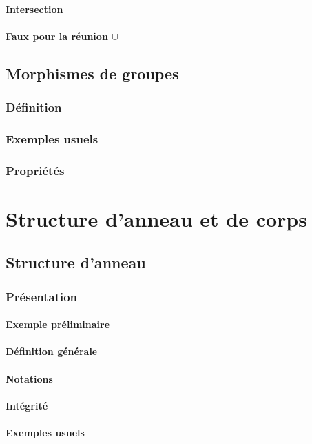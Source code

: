 \documentclass[12pt,a4paper,french]{book}
\begin{document}
			\subsubsection{Intersection}
			\subsubsection{Faux pour la réunion $\cup$}
	\section{Morphismes de groupes}
		\subsection{Définition}
		\subsection{Exemples usuels}
		\subsection{Propriétés}
		
\chapter{Structure d'anneau et de corps}
	\section{Structure d'anneau}
		\subsection{Présentation}
			\subsubsection{Exemple préliminaire}
			\subsubsection{Définition générale}
			\subsubsection{Notations}
			\subsubsection{Intégrité}
			\subsubsection{Exemples usuels}
\end{document}
